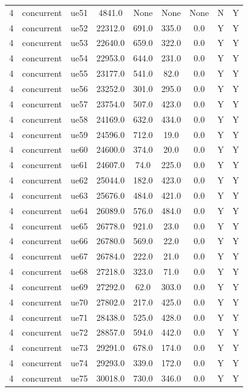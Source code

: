 \begin{table}[ht]
\begin{tabular}{|c|c|c|c|c|c|c|c|c|}
4 & concurrent & ue51 & 4841.0 & None & None & None & N & Y \\
4 & concurrent & ue52 & 22312.0 & 691.0 & 335.0 & 0.0 & Y & Y \\
4 & concurrent & ue53 & 22640.0 & 659.0 & 322.0 & 0.0 & Y & Y \\
4 & concurrent & ue54 & 22953.0 & 644.0 & 231.0 & 0.0 & Y & Y \\
4 & concurrent & ue55 & 23177.0 & 541.0 & 82.0 & 0.0 & Y & Y \\
4 & concurrent & ue56 & 23252.0 & 301.0 & 295.0 & 0.0 & Y & Y \\
4 & concurrent & ue57 & 23754.0 & 507.0 & 423.0 & 0.0 & Y & Y \\
4 & concurrent & ue58 & 24169.0 & 632.0 & 434.0 & 0.0 & Y & Y \\
4 & concurrent & ue59 & 24596.0 & 712.0 & 19.0 & 0.0 & Y & Y \\
4 & concurrent & ue60 & 24600.0 & 374.0 & 20.0 & 0.0 & Y & Y \\
4 & concurrent & ue61 & 24607.0 & 74.0 & 225.0 & 0.0 & Y & Y \\
4 & concurrent & ue62 & 25044.0 & 182.0 & 423.0 & 0.0 & Y & Y \\
4 & concurrent & ue63 & 25676.0 & 484.0 & 421.0 & 0.0 & Y & Y \\
4 & concurrent & ue64 & 26089.0 & 576.0 & 484.0 & 0.0 & Y & Y \\
4 & concurrent & ue65 & 26778.0 & 921.0 & 23.0 & 0.0 & Y & Y \\
4 & concurrent & ue66 & 26780.0 & 569.0 & 22.0 & 0.0 & Y & Y \\
4 & concurrent & ue67 & 26784.0 & 222.0 & 21.0 & 0.0 & Y & Y \\
4 & concurrent & ue68 & 27218.0 & 323.0 & 71.0 & 0.0 & Y & Y \\
4 & concurrent & ue69 & 27292.0 & 62.0 & 303.0 & 0.0 & Y & Y \\
4 & concurrent & ue70 & 27802.0 & 217.0 & 425.0 & 0.0 & Y & Y \\
4 & concurrent & ue71 & 28438.0 & 525.0 & 428.0 & 0.0 & Y & Y \\
4 & concurrent & ue72 & 28857.0 & 594.0 & 442.0 & 0.0 & Y & Y \\
4 & concurrent & ue73 & 29291.0 & 678.0 & 174.0 & 0.0 & Y & Y \\
4 & concurrent & ue74 & 29293.0 & 339.0 & 172.0 & 0.0 & Y & Y \\
4 & concurrent & ue75 & 30018.0 & 730.0 & 346.0 & 0.0 & Y & Y \\

\end{tabular}
\end{table}
